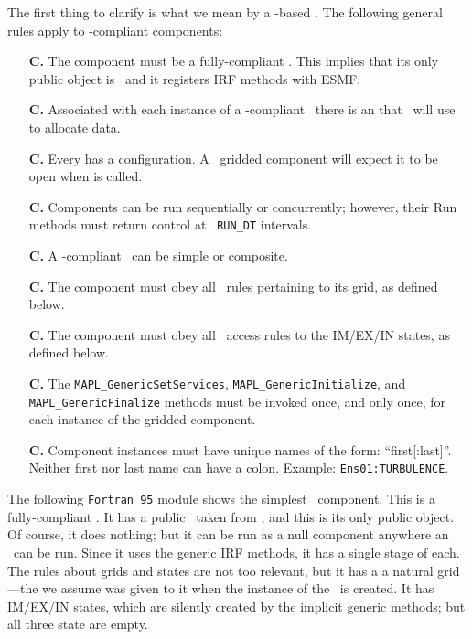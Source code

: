The first thing to clarify is what we mean by a \ggn -based \egc.
The following general rules apply to \ggn -compliant components:
%
\begin{itemize}
\item[{\bf C.\thegenct}] The component must be a fully-compliant \egc.
  This implies that its only public object is \ssv\  and it registers
  IRF methods with ESMF.
\addtocounter{genct}{1}
%
\item[{\bf C.\thegenct}] Associated with each instance of a \ggn-compliant
  \egc\  there is an \grd that \ggn\  will use to allocate data.
\addtocounter{genct}{1}
%
\item[{\bf C.\thegenct}] Every \egc  has a configuration. A \ggn\  gridded
 component will expect it to be open when \ssv  is called.
\addtocounter{genct}{1}
%
\item[{\bf C.\thegenct}] Components can be run sequentially or
  concurrently; however, their Run methods must return control at {\tt
  RUN\_DT} intervals.
\addtocounter{genct}{1}
%
\item[{\bf C.\thegenct}]  A \ggn -compliant \egc\  can be simple or composite.
\addtocounter{genct}{1}

\item[{\bf C.\thegenct}] The component must obey all \ggn\   rules 
  pertaining to its grid, as defined below.
\addtocounter{genct}{1}
%
\item[{\bf C.\thegenct}] The component must obey all \ggn\  access rules
 to the IM/EX/IN  states, as defined below.
\addtocounter{genct}{1}
%
\item[{\bf C.\thegenct}] The {\tt MAPL\_GenericSetServices}, 
  {\tt MAPL\_GenericInitialize}, and {\tt MAPL\_GenericFinalize}
  methods must be invoked once, and only once, for each instance of
  the gridded component.
\addtocounter{genct}{1}
%
\item[{\bf C.\thegenct}] Component instances must have unique names 
   of the form: ``first[:last]''. Neither first nor last name can have a
  colon. Example: {\tt Ens01:TURBULENCE}.
\addtocounter{genct}{1}
%
\end{itemize}

The following {\tt Fortran 95} module
shows the simplest \ggn\  component. This is a fully-compliant \egc.
It has a public \ssv\  taken from \ggn, and this is its only
public object. Of course, it does nothing; but it can be run as a null
component anywhere an \egc\  can be run. Since it uses the generic IRF
methods, it has a single stage of each. The rules about grids and
states are not too relevant, but it has a a natural grid---the \grd
we assume was given to it when the instance of the \egc\  is created.
It has IM/EX/IN states, which are silently created by the implicit
generic methods; but all three state are empty.

